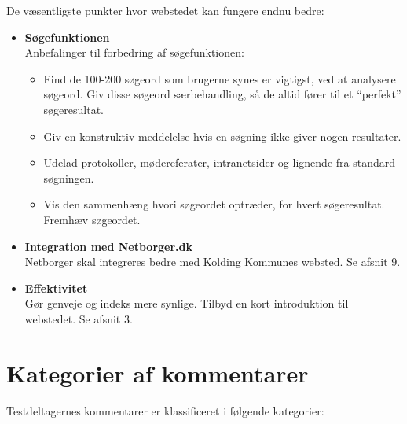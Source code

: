 \documentclass[10pt,a4paper]{article}      %
\begin{document}
\noindent De væsentligste punkter hvor webstedet kan fungere endnu bedre:
\begin{itemize}
  \item \textbf{Søgefunktionen}\\
  Anbefalinger til forbedring af søgefunktionen:
  \begin{itemize}
    \item Find de 100-200 søgeord som brugerne synes er vigtigst, ved at analysere søgeord. Giv disse søgeord særbehandling, så de altid fører til et ``perfekt'' søgeresultat.
    \item Giv en konstruktiv meddelelse hvis en søgning ikke giver nogen resultater.
    \item Udelad protokoller, mødereferater, intranetsider og lignende fra stan\-dard-søgningen.
    \item Vis den sammenhæng hvori søgeordet optræder, for hvert søgeresultat. Fremhæv søgeordet.
  \end{itemize}
  \item \textbf{Integration med Netborger.dk}\\
  Netborger skal integreres bedre med Kolding Kommunes websted. Se afsnit 9.
  \item \textbf{Effektivitet}\\
  Gør genveje og indeks mere synlige. Tilbyd en kort introduktion til webstedet. Se afsnit 3.
\end{itemize}

\clearpage

\tableofcontents
\clearpage


\section{Kategorier af kommentarer}
Testdeltagernes kommentarer er klassificeret i følgende kategorier:
\end{document}
